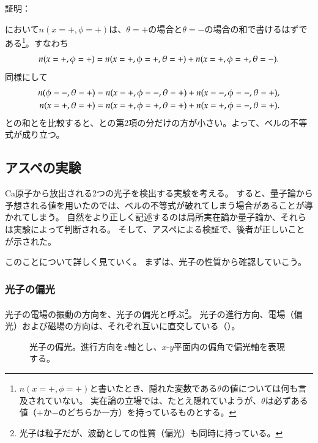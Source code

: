 \documentclass[10pt,b5paper,papersize,dvipdfmx]{jsbook}
\begin{document}
\noindent 証明：\par
{}において$n(x=+,\phi=+)$は、$\theta = +$の場合と$\theta = -$の場合の和で書けるはずである\footnote{
  $n(x=+,\phi=+)$と書いたとき、隠れた変数である$\theta$の値については何も言及されていない。
  実在論の立場では、たとえ隠れていようが、$\theta$は必ずある値（$+$か$-$のどちらか一方）を持っているものとする。
}。すなわち
\begin{align}
  \label{eq:bell-1}
  n(x=+,\phi=+) = \textcolor{red}{n(x=+,\phi=+, \theta=+)} + n(x=+,\phi=+, \theta=-).
\end{align}
同様にして
\begin{align}
  \label{eq:bell-2}
  n(\phi=-,\theta=+) &= \textcolor{blue}{n(x=+, \phi=-,\theta=+)} + n(x=-, \phi=-,\theta=+)
  , \\
  \label{eq:bell-3}
  n(x=+,\theta=+) &= \textcolor{red}{n(x=+, \phi=+, \theta=+)} + \textcolor{blue}{n(x=+, \phi=-, \theta=+)}.
\end{align}
との和とを比較すると、との第2項の分だけの方が小さい。よって、ベルの不等式が成り立つ。
\QED

%
\subsection{アスペの実験} %
Ca原子から放出される2つの光子を検出する実験を考える。
すると、量子論から予想される値を用いたのでは、ベルの不等式が破れてしまう場合があることが導かれてしまう。
自然をより正しく記述するのは局所実在論か量子論か、それらは実験によって判断される。
そして、アスペによる検証で、後者が正しいことが示された。\par
このことについて詳しく見ていく。
まずは、光子の性質から確認していこう。

%
\subsubsection{光子の偏光} %

光子の電場の振動の方向を、光子の偏光と呼ぶ\footnote{
  光子は粒子だが、波動としての性質（偏光）も同時に持っている。
}。
光子の進行方向、電場（偏光）および磁場の方向は、それぞれ互いに直交している（）。

\begin{figure}[ht]
  \centering
  
  \caption{光子の偏光。進行方向を$z$軸とし、$x$-$y$平面内の偏角で偏光軸を表現する。}
  \label{fig:photon-henkou}
\end{figure}
\end{document}
